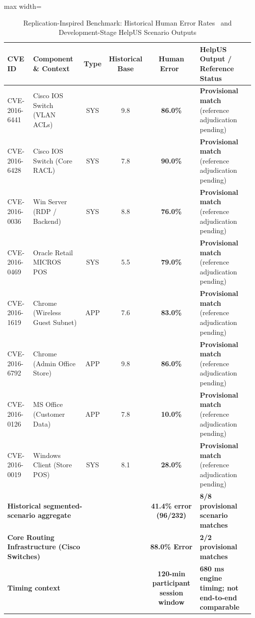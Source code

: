 \begin{table}[htbp]
\centering
\scriptsize
\caption{Replication-Inspired Benchmark: Historical Human Error Rates~\cite{santos2017estimating} and Development-Stage HelpUS Scenario Outputs}
\label{tab:santos_comparison}
\begin{adjustbox}{max width=\textwidth}
\begin{tabular}{lp{3.4cm}cccp{3.4cm}}
\toprule
\textbf{CVE ID} & \textbf{Component \& Context} & \textbf{Type} & \textbf{Historical Base} & \textbf{Human Error~\cite{santos2017estimating}} & \textbf{HelpUS Output / Reference Status} \\
\midrule
CVE-2016-6441 & Cisco IOS Switch (VLAN ACLs) & SYS & 9.8 & \textbf{86.0\%} & \textbf{Provisional match} (reference adjudication pending) \\
CVE-2016-6428 & Cisco IOS Switch (Core RACL)  & SYS & 7.8 & \textbf{90.0\%} & \textbf{Provisional match} (reference adjudication pending) \\
CVE-2016-0036 & Win Server (RDP / Backend)   & SYS & 8.8 & \textbf{76.0\%} & \textbf{Provisional match} (reference adjudication pending) \\
CVE-2016-0469 & Oracle Retail MICROS POS      & SYS & 5.5 & \textbf{79.0\%} & \textbf{Provisional match} (reference adjudication pending) \\
CVE-2016-1619 & Chrome (Wireless Guest Subnet)& APP & 7.6 & \textbf{83.0\%} & \textbf{Provisional match} (reference adjudication pending) \\
CVE-2016-6792 & Chrome (Admin Office Store)   & APP & 9.8 & \textbf{86.0\%} & \textbf{Provisional match} (reference adjudication pending) \\
CVE-2016-0126 & MS Office (Customer Data)     & APP & 7.8 & \textbf{10.0\%} & \textbf{Provisional match} (reference adjudication pending) \\
CVE-2016-0019 & Windows Client (Store POS)    & SYS & 8.1 & \textbf{28.0\%} & \textbf{Provisional match} (reference adjudication pending) \\
\midrule
\multicolumn{3}{l}{\textbf{Historical segmented-scenario aggregate}} & & \textbf{41.4\% error (96/232)} & \textbf{8/8 provisional scenario matches} \\
\multicolumn{3}{l}{\textbf{Core Routing Infrastructure (Cisco Switches)}} & & \textbf{88.0\% Error} & \textbf{2/2 provisional matches} \\
\multicolumn{3}{l}{\textbf{Timing context}} & & \textbf{120-min participant session window} & \textbf{680 ms engine timing; not end-to-end comparable} \\
\bottomrule
\end{tabular}
\end{adjustbox}
\end{table}

